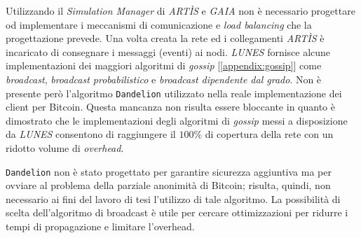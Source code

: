 Utilizzando il \textit{Simulation Manager} di \textit{ARTÌS} e \textit{GAIA} non è necessario progettare od implementare i meccanismi di comunicazione e \textit{load balancing} che la progettazione prevede. Una volta creata la rete ed i collegamenti \textit{ARTÌS} è incaricato di consegnare i messaggi (eventi) ai nodi.\newline
\textit{LUNES} fornisce alcune implementazioni dei maggiori algoritmi di \textit{gossip} [\ref{appendix:gossip}] come \textit{broadcast}, \textit{broadcast probabilistico} e \textit{broadcast dipendente dal grado}. Non è presente però l'algoritmo \texttt{Dandelion} utilizzato nella reale implementazione dei client per Bitcoin. Questa mancanza non risulta essere bloccante in quanto è dimostrato\cite{gdalunes} che le implementazioni degli algoritmi di \textit{gossip} messi a disposizione da \textit{LUNES} consentono di raggiungere il $100\%$ di copertura della rete con un ridotto volume di \textit{overhead}.

\texttt{Dandelion} non è stato progettato per garantire sicurezza aggiuntiva ma per ovviare al problema della parziale anonimità di Bitcoin; risulta, quindi, non necessario ai fini del lavoro di tesi l'utilizzo di tale algoritmo.
La possibilità di scelta dell'algoritmo di broadcast è utile per cercare ottimizzazioni per ridurre i tempi di propagazione e limitare l'overhead.

